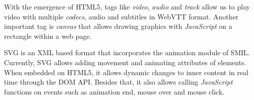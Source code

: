 \documentclass[10pt,conference]{IEEEtran}
\begin{document}







  With the emergence of \gls{HTML}5, tags like \emph{video}, \emph{audio} and \emph{track} allow us to play video with multiple \emph{codecs}, audio and subtitles in \gls{WebVTT} format.
Another important tag is \emph{canvas} that allows drawing graphics with \emph{JavaScript} on a rectangle within a web page.


  \gls{SVG} is an \gls{XML} based format that incorporates the animation module of \gls{SMIL}. Currently, \gls{SVG} allows adding movement and animating attributes of elements. When embedded on \gls{HTML}5, it allows dynamic changes to inner content in real time through the \gls{DOM} \gls{API}. Besides that, it also allows calling \emph{JavaScript} functions on events such as animation end, mouse over and mouse click.
  
\end{document}
